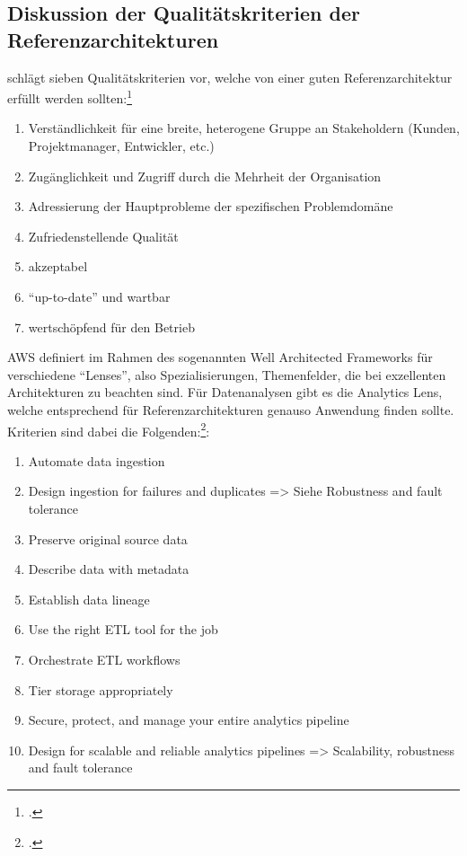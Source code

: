 \subsection{Diskussion der Qualitätskriterien der Referenzarchitekturen}\label{chap:qualitycriteria}
\citeauthor{Muller.2020} schlägt sieben Qualitätskriterien vor, welche von einer guten Referenzarchitektur erfüllt werden sollten:\footcite[Vgl. auch im Folgenden][8]{Muller.2020}
\begin{enumerate}
\item Verständlichkeit für eine breite, heterogene Gruppe an Stakeholdern (Kunden, Projektmanager, Entwickler, etc.)
\item Zugänglichkeit und Zugriff durch die Mehrheit der Organisation
\item Adressierung der Hauptprobleme der spezifischen Problemdomäne
\item Zufriedenstellende Qualität
\item akzeptabel
\item \enquote{up-to-date} und wartbar
\item wertschöpfend für den Betrieb
\end{enumerate}

\ac{AWS} definiert im Rahmen des sogenannten Well Architected Frameworks für verschiedene \enquote{Lenses}, also Spezialisierungen, Themenfelder, die bei exzellenten Architekturen zu beachten sind. Für Datenanalysen gibt es die Analytics Lens, welche entsprechend für Referenzarchitekturen genauso Anwendung finden sollte. Kriterien sind dabei die Folgenden:\footcite[Vgl.][6]{Ravirala.2020}:
\begin{enumerate}
\item Automate data ingestion
\item Design ingestion for failures and duplicates => Siehe Robustness and fault tolerance
\item Preserve original source data
\item Describe data with metadata
\item Establish data lineage
\item Use the right ETL tool for the job
\item Orchestrate ETL workflows
\item Tier storage appropriately
\item Secure, protect, and manage your entire analytics pipeline
\item Design for scalable and reliable analytics pipelines => Scalability, robustness and fault tolerance
\end{enumerate}


